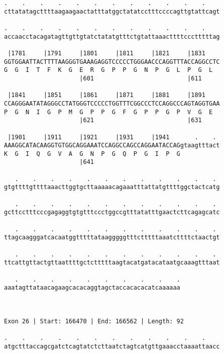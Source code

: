 \documentclass{article}
\begin{document}
\begin{Verbatim}
.    .    .    .    .    .    .    .    .    .    .    .    
cttatatagcttttaagaagaactatttatggctatatcctttccccagttgtattcagt
                                                            
.    .    .    .    .    .    .    .    .    .    .    .    
accaacctacagatagttgttgtatctatatgtttctgtattaaacttttccctttttag
                                                            
 |1781     |1791     |1801     |1811     |1821     |1831    
GGTGGAATTACTTTTAAGGGTGAAAGAGGTCCCCCTGGGAACCCAGGTTTACCAGGCCTC
G  G  I  T  F  K  G  E  R  G  P  P  G  N  P  G  L  P  G  L  
                     |601                          |611     
  
 |1841     |1851     |1861     |1871     |1881     |1891    
CCAGGGAATATAGGGCCTATGGGTCCCCCTGGTTTCGGCCCTCCAGGCCCAGTAGGTGAA
P  G  N  I  G  P  M  G  P  P  G  F  G  P  P  G  P  V  G  E  
                     |621                          |631     
  
 |1901     |1911     |1921     |1931     |1941       .    . 
AAAGGCATACAAGGTGTGGCAGGAAATCCAGGCCAGCCAGGAATACCAGgtaagtttact
K  G  I  Q  G  V  A  G  N  P  G  Q  P  G  I  P  G           
                     |641                                   
  
   .    .    .    .    .    .    .    .    .    .    .    . 
gtgttttgttttaaacttggtgcttaaaaacagaaatttattatgttttggctactcatg
                                                            
   .    .    .    .    .    .    .    .    .    .    .    . 
gcttcctttcccgagaggtgtgtttccctggccgtttatatttgaactcttcagagcatc
                                                            
   .    .    .    .    .    .    .    .    .    .    .    . 
ttagcaagggatcacaatggtttttataagggggtttctttttaaatcttttctaactgt
                                                            
   .    .    .    .    .    .    .    .    .    .    .    . 
ttcattgttactgttaattttgctctttttaagtacatgatacataatgcaaagtttaat
                                                            
   .    .    .    .    .    .    .    .    .    .
aaatagttataacagaagcacacaggtagctaccacacacatcaaaaaa
                                                 
                                                 
 
Exon 26 | Start: 166470 | End: 166562 | Length: 92
 
.    .    .    .    .    .    .    .    .    .    .    .    
atgctttaccagcgatctcagtatctcttaatctagtcatgttgaaacctaaaattaacc
                                                            

\end{Verbatim}
\end{document}
